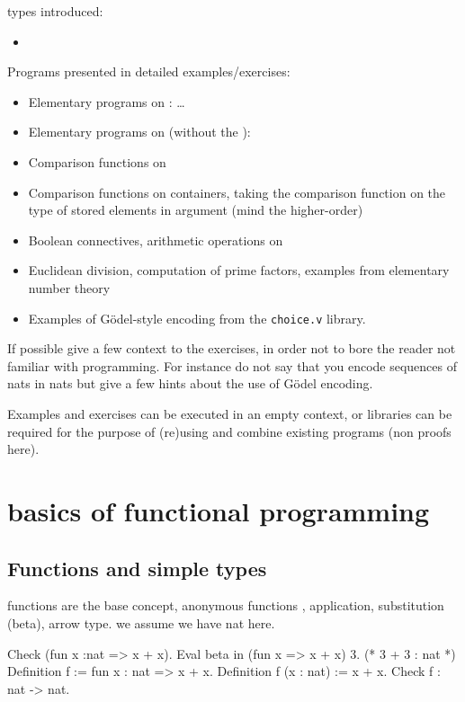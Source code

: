 \Coq{} types introduced:
\begin{itemize}
\item {}
\end{itemize}

Programs presented in detailed examples/exercises:
\begin{itemize}
\item Elementary programs on : \dots
\item Elementary programs on  (without the ):
\item Comparison functions on 
\item Comparison functions on containers, taking the comparison
  function on the type of stored elements in argument (mind the
  higher-order)
\item Boolean connectives, arithmetic operations on 
\item Euclidean division, computation of prime factors, examples from
  elementary number theory
\item Examples of G{\"o}del-style encoding from the {\tt choice.v} library.
\end{itemize}
If possible give a few context to the exercises, in order not to bore
the reader not familiar with programming. For instance do not say that
you encode sequences of nats in nats but give a few hints about the
use of G{\"o}del encoding.

Examples and exercises can be executed in an empty context, or
libraries can be required for the purpose of (re)using and combine existing
programs (non proofs here).
\section{basics of functional programming}

\subsection{Functions and simple types}
functions are the base concept,
anonymous functions ,
application,
substitution (beta), arrow type.
we assume we have nat here.

\begin{coq}{}
Check (fun x :nat => x + x).
Eval beta in (fun x => x + x) 3. (* 3 + 3 : nat *)
Definition f := fun x : nat => x + x.
Definition f (x : nat) := x + x.
Check f : nat -> nat.
\end{coq}

